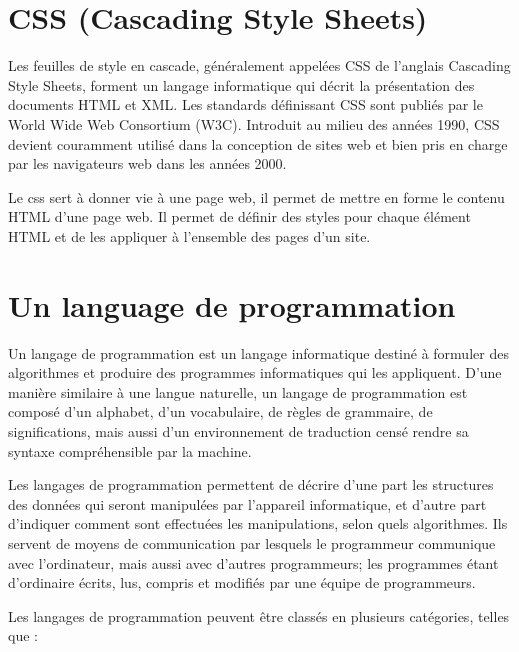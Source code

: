 \section{CSS (Cascading Style Sheets)}\label{sec:css}
Les feuilles de style en cascade, généralement appelées CSS de l'anglais Cascading Style Sheets,
forment un langage informatique qui décrit la présentation des documents HTML et XML.
Les standards définissant CSS sont publiés par le World Wide Web Consortium (W3C).
Introduit au milieu des années 1990, CSS devient couramment utilisé dans la conception
de sites web et bien pris en charge par les navigateurs web dans les années 2000.

Le css sert à donner vie à une page web, il permet de mettre en forme le contenu HTML
d'une page web. Il permet de définir des styles pour chaque élément HTML et de les
appliquer à l'ensemble des pages d'un site.

\section{Un language de programmation}\label{sec:language-de-programmation}
Un langage de programmation est un langage informatique destiné à formuler des algorithmes et
produire des programmes informatiques qui les appliquent. D'une manière similaire à une langue
naturelle, un langage de programmation est composé d'un alphabet, d'un vocabulaire, de règles
de grammaire, de significations, mais aussi d'un environnement de traduction censé rendre
sa syntaxe compréhensible par la machine.

Les langages de programmation permettent de décrire d'une part les structures des données
qui seront manipulées par l'appareil informatique, et d'autre part d'indiquer comment sont
effectuées les manipulations, selon quels algorithmes. Ils servent de moyens de communication
par lesquels le programmeur communique avec l'ordinateur, mais aussi avec d'autres programmeurs;
les programmes étant d'ordinaire écrits, lus, compris et modifiés par une équipe de programmeurs.


Les langages de programmation peuvent être classés en plusieurs catégories, telles que :

